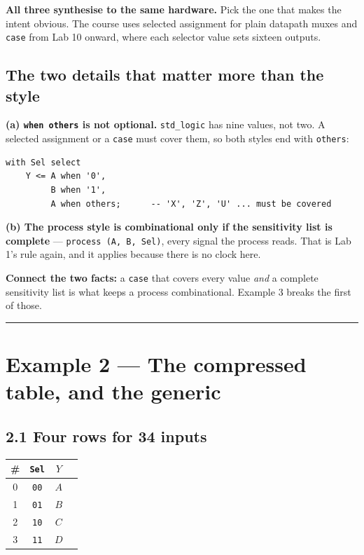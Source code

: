 \documentclass[11pt]{article}
\newcommand{\code}[1]{\texttt{#1}}
\newcommand{\hr}{\vspace{2pt}\hrule\vspace{6pt}}
\begin{document}
\textbf{All three synthesise to the same hardware.} Pick the one that makes the
intent obvious. The course uses selected assignment for plain datapath muxes and
\code{case} from Lab 10 onward, where each selector value sets sixteen outputs.

\subsection*{The two details that matter more than the style}

\textbf{(a) \code{when others} is not optional.} \code{std\_logic} has nine
values, not two. A selected assignment or a \code{case} must cover them, so both
styles end with \code{others}:

\begin{lstlisting}
with Sel select
    Y <= A when '0',
         B when '1',
         A when others;      -- 'X', 'Z', 'U' ... must be covered
\end{lstlisting}

\textbf{(b) The process style is combinational only if the sensitivity list is
complete} --- \code{process (A, B, Sel)}, every signal the process reads. That is
Lab 1's rule again, and it applies because there is no clock here.

\textbf{Connect the two facts:} a \code{case} that covers every value \emph{and} a
complete sensitivity list is what keeps a process combinational. Example 3 breaks
the first of those.

\vspace{4pt}\hr

\section*{Example 2 --- The compressed table, and the generic}

\subsection*{2.1 Four rows for 34 inputs}

\begin{center}
\begin{tabular}{c|c|c|l}
\toprule
\# & \code{Sel} & $Y$ & \\
\midrule
0 & \code{00} & $A$ & \\
1 & \code{01} & $B$ & \\
2 & \code{10} & $C$ & \\
3 & \code{11} & $D$ & \\
\bottomrule
\end{tabular}
\end{center}
\end{document}
